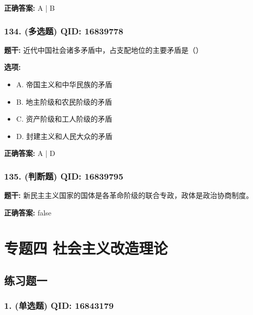\documentclass[12pt,UTF8]{ctexart}
\begin{document}
\textbf{正确答案:}
A | B

\vspace{0.3em}\hrulefill\vspace{0.7em}

\subsubsection*{134. (多选题) \small QID: 16839778}

\textbf{题干:}
近代中国社会诸多矛盾中，占支配地位的主要矛盾是（）

\textbf{选项:}
\begin{itemize}[leftmargin=*]

  \item A. 帝国主义和中华民族的矛盾

  \item B. 地主阶级和农民阶级的矛盾

  \item C. 资产阶级和工人阶级的矛盾

  \item D. 封建主义和人民大众的矛盾

\end{itemize}

\textbf{正确答案:}
A | D

\vspace{0.3em}\hrulefill\vspace{0.7em}

\subsubsection*{135. (判断题) \small QID: 16839795}

\textbf{题干:}
新民主主义国家的国体是各革命阶级的联合专政，政体是政治协商制度。

\textbf{正确答案:}
false

\vspace{0.3em}\hrulefill\vspace{0.7em}

\section*{专题四 社会主义改造理论}
\hrulefill

\subsection*{练习题一}

\subsubsection*{1. (单选题) \small QID: 16843179}
\end{document}

